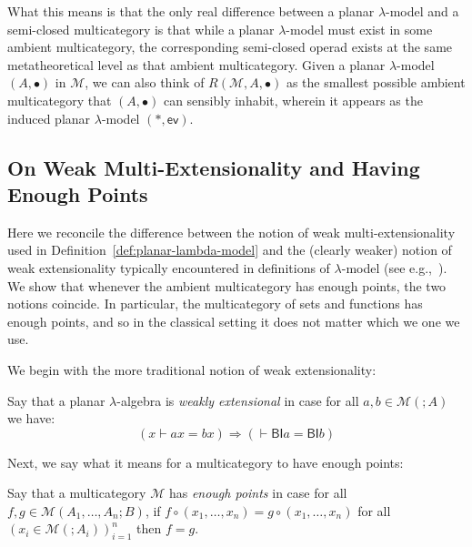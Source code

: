 \documentclass{llncs}
\begin{document}
What this means is that the only real difference between a planar $\lambda$-model and a semi-closed multicategory is that while a planar $\lambda$-model must exist in some ambient multicategory, the corresponding semi-closed operad exists at the same metatheoretical level as that ambient multicategory. Given a planar $\lambda$-model $(A,\bullet)$ in $\mathcal{M}$, we can also think of $R(\mathcal{M},A,\bullet)$ as the smallest possible ambient multicategory that $(A,\bullet)$ can sensibly inhabit, wherein it appears as the induced planar $\lambda$-model $(*,\mathsf{ev})$.

\subsection{On Weak Multi-Extensionality and Having Enough Points}\label{sec:enough-points}
Here we reconcile the difference between the notion of weak multi-extensionality used in Definition~\ref{def:planar-lambda-model} and the (clearly weaker) notion of weak extensionality typically encountered in definitions of $\lambda$-model (see e.g.,~\cite{Scott1980,Hindley2008}). We show that whenever the ambient multicategory has enough points, the two notions coincide. In particular, the multicategory of sets and functions has enough points, and so in the classical setting it does not matter which we one we use.

We begin with the more traditional notion of weak extensionality:
\begin{definition}\label{def:weak-extensionality}
  Say that a planar $\lambda$-algebra is \emph{weakly extensional} in case for all $a,b \in \mathcal{M}(;A)$ we have:
  \[
    (x \vdash ax = bx) \Rightarrow (\vdash \mathsf{BI}a = \mathsf{BI}b)
  \]
\end{definition}

Next, we say what it means for a multicategory to have enough points:
\begin{definition}\label{def:enough-points}
  Say that a multicategory $\mathcal{M}$ has \emph{enough points} in case for all $f,g \in \mathcal{M}(A_1,\ldots,A_n ; B)$, if $f \circ (x_1,\ldots,x_n) = g \circ (x_1,\ldots,x_n)$ for all $(x_i \in \mathcal{M}(;A_i))_{i=1}^n$ then $f = g$.
\end{definition}
\end{document}
